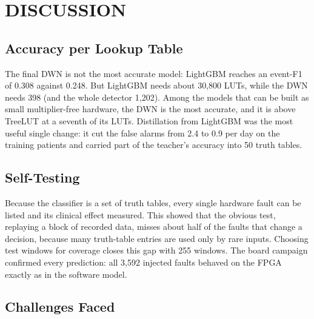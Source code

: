 \chapter{DISCUSSION}\label{ch:discussion}

\section{Accuracy per Lookup Table}

The final DWN is not the most accurate model: LightGBM reaches an event-F1 of 0.308 against 0.248. But LightGBM needs
about 30,800 LUTs, while the DWN needs 398 (and the whole detector 1,202). Among the models that can be built as small
multiplier-free hardware, the DWN is the most accurate, and it is above TreeLUT at a seventh of its LUTs. Distillation
from LightGBM was the most useful single change: it cut the false alarms from 2.4 to 0.9 per day on the training
patients and carried part of the teacher's accuracy into 50 truth tables.

\section{Self-Testing}

Because the classifier is a set of truth tables, every single hardware fault can be listed and its clinical effect
measured. This showed that the obvious test, replaying a block of recorded data, misses about half of the faults that
change a decision, because many truth-table entries are used only by rare inputs. Choosing test windows for coverage
closes this gap with 255 windows. The board campaign confirmed every prediction: all 3,592 injected faults behaved on
the FPGA exactly as in the software model.

\section{Challenges Faced}

